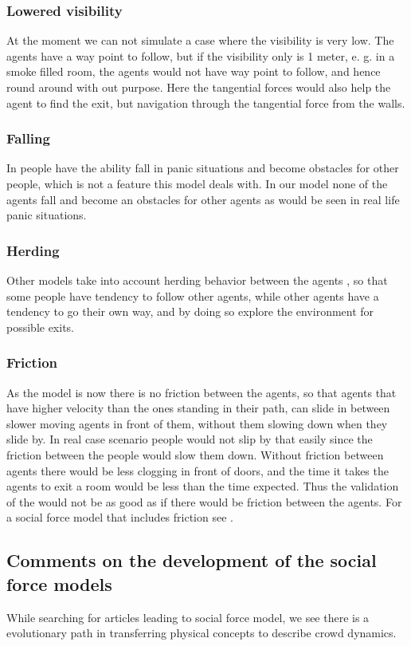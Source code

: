 \subsubsection{Lowered visibility}
At the moment we can not simulate a case where the visibility is very low. The 
agents have a way point to follow, but if the visibility only is 1 meter, e. 
g. in a smoke filled room, the  agents would not have way point to follow, and 
hence round around with out purpose. Here the tangential forces would also 
help the agent to find the exit, but navigation through the tangential force 
from the walls. %

\subsubsection{Falling}
In \cite{HiDAC} people have the ability fall in panic situations and become 
obstacles for other people, which is not a feature this model deals with. In 
our model none of the agents fall and become an obstacles for other agents as 
would be seen in real life panic situations.

\subsubsection{Herding}
Other models take into account herding behavior between the agents  
\cite{helbing00}, so that some people have tendency to follow other agents, 
while other agents have a tendency to go their own way,  and by doing so 
explore the environment for possible exits.

\subsubsection{Friction}
As the model is now there is no friction between the agents, so that agents 
that have higher velocity than the ones standing in their path, can slide in 
between slower moving agents in front of them, without them slowing down when 
they slide by. In real case scenario people would not slip by that easily 
since the friction between the people would slow them down.  Without friction 
between agents there would be less clogging in front of doors, and the time it 
takes the agents to exit a room would be less than the time expected. Thus the 
validation of the would not be as good as if there would be friction between 
the agents. For a social force model that includes friction see \cite{HelbingNew}.

\subsection{Comments on the development of the social force models}
\label{subsec:development}
While searching for articles leading to social force model, we see there is a 
evolutionary path in transferring physical concepts to describe crowd dynamics.

